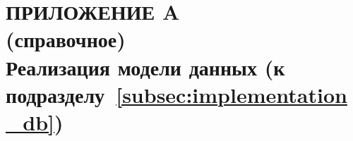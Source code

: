 \renewcommand{\thefigure}{\Asbuk{section}.\arabic{figure}}
\renewcommand{\thetable}{\Asbuk{section}.\arabic{table}}
\renewcommand{\thelstlisting}{\Asbuk{section}.\arabic{lstlisting}}

\fancyhf{} %
\fancyfoot[R]{\thepage}
\setlength{\footskip}{0mm}
\setlength{\headheight}{11mm}

\thispagestyle{plain}
\section*{%
  ПРИЛОЖЕНИЕ A \\
  (справочное) \\
  Реализация модели данных
  (к подразделу~\ref{subsec:implementation_db})
}

\setcounter{section}{1}
\setcounter{figure}{0}
\setcounter{table}{0}
\setcounter{lstlisting}{0}

\vspace{-\baselineskip}

\pagebreak